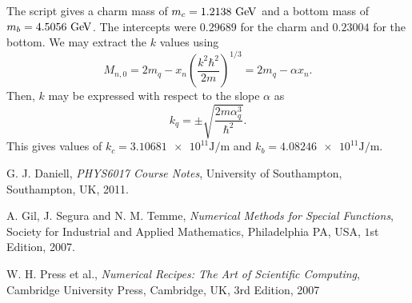 \documentclass[]{article}
\begin{document}
The script gives a charm mass of $m_{c} = 1.2138\GeV$ and a bottom mass of $m_{b} = 4.5056\GeV$. The intercepts were $0.29689$ for the charm and $0.23004$ for the bottom. We may extract the $k$ values using
$$M_{n,0} = 2m_{q} - x_{n}\left(\frac{k^{2}\hbar^{2}}{2m}\right)^{1/3} = 2m_{q} - \alpha x_{n}.$$
Then, $k$ may be expressed with respect to the slope $\alpha$ as
$$k_{q} = \pm\sqrt{\frac{2m\alpha_{q}^{3}}{\hbar^{2}}}.$$
This gives values of $k_{c} = \num{3.10681e11}\si{\joule\per\metre}$ and $k_{b} = \num{4.08246e11}\si{\joule\per\metre}$.

\begin{thebibliography}{9}
  G. J. Daniell,
  \emph{PHYS6017 Course Notes},
  University of Southampton, Southampton, UK,
  2011.
  
  A. Gil, J. Segura and N. M. Temme,
  \emph{Numerical Methods for Special Functions},
  Society for Industrial and Applied Mathematics, Philadelphia PA, USA,
  $1$st Edition,
  2007.
  
  W. H. Press et al.,
  \emph{Numerical Recipes: The Art of Scientific Computing},
  Cambridge University Press, Cambridge, UK,
  $3$rd Edition,
  2007
  
\end{thebibliography}
\end{document}

